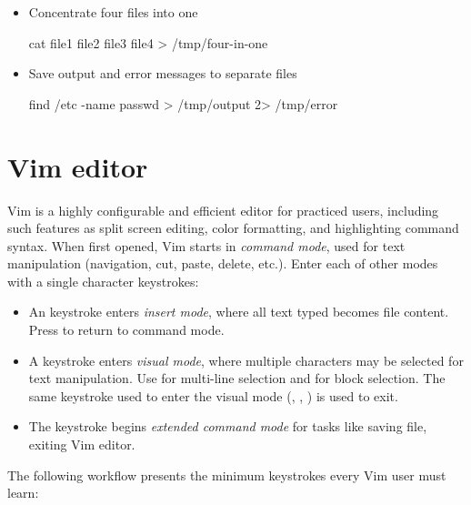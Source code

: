 \begin{itemize}
\item Concentrate four files into one
\begin{commandshell}
cat file1 file2 file3 file4 > /tmp/four-in-one
\end{commandshell}

\item Save output and error messages to separate files
\begin{commandshell}
find /etc -name passwd > /tmp/output 2> /tmp/error
\end{commandshell}

\end{itemize}

\section{Vim editor}

Vim is a highly configurable and efficient editor for practiced users, including such features as split screen editing, color formatting, and highlighting command syntax. When first opened, Vim starts in \emph{command mode}, used for text manipulation (navigation, cut, paste, delete, etc.). Enter each of other modes with a single character keystrokes:

\begin{itemize}
\item An  keystroke enters \emph{insert mode}, where all text typed becomes file content. Press  to return to command mode.

\item A  keystroke enters \emph{visual mode}, where multiple characters may be selected for text manipulation. Use  for multi-line selection and  for block selection. The same keystroke used to enter the visual mode (, , ) is used to exit.

\item The \code{:} keystroke begins \emph{extended command mode} for tasks like saving file, exiting Vim editor.
\end{itemize}

The following workflow presents the minimum keystrokes every Vim user must learn:

